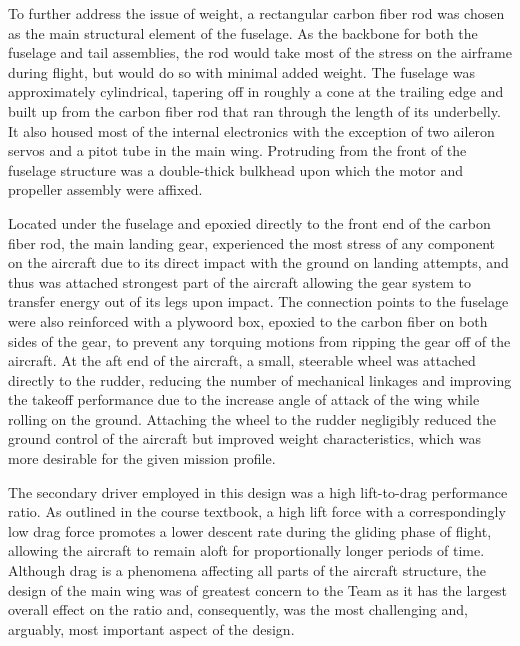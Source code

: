 \documentclass[titlepage]{article}
\begin{document}
To further address the issue of weight, a rectangular carbon fiber rod was chosen as the main structural element of the fuselage. As the backbone for both the fuselage and tail assemblies, the rod would take most of the stress on the airframe during flight, but would do so with minimal added weight. The fuselage was approximately cylindrical, tapering off in roughly a cone at the trailing edge and built up from the carbon fiber rod that ran through the length of its underbelly. It also housed most of the internal electronics with the exception of two aileron servos and a pitot tube in the main wing. Protruding from the front of the fuselage structure was a double-thick bulkhead upon which the motor and propeller assembly were affixed.

Located under the fuselage and epoxied directly to the front end of the carbon fiber rod, the main landing gear, experienced the most stress of any component on the aircraft due to its direct impact with the ground on landing attempts, and thus was attached strongest part of the aircraft allowing the gear system to transfer energy out of its legs upon impact. The connection points to the fuselage were also reinforced with a plywoord box, epoxied to the carbon fiber on both sides of the gear, to prevent any torquing motions from ripping the gear off of the aircraft. At the aft end of the aircraft, a small, steerable wheel was attached directly to the rudder, reducing the number of mechanical linkages and improving the takeoff performance due to the increase angle of attack of the wing while rolling on the ground. Attaching the wheel to the rudder negligibly reduced the ground control of the aircraft but improved weight characteristics, which was more desirable for the given mission profile.

The secondary driver employed in this design was a high lift-to-drag performance ratio. As outlined in the course textbook, a high lift force with a correspondingly low drag force promotes a lower descent rate during the gliding phase of flight, allowing the aircraft to remain aloft for proportionally longer periods of time. Although drag is a phenomena affecting all parts of the aircraft structure, the design of the main wing was of greatest concern to the Team as it has the largest overall effect on the ratio and, consequently, was the most challenging and, arguably, most important aspect of the design. 
\end{document}
